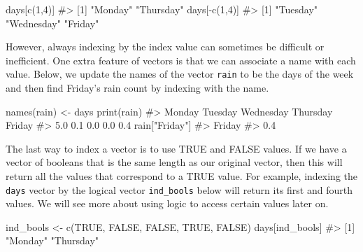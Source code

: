 \documentclass[
  letterpaper,
]{krantz}
\makeatletter
\newenvironment{Shaded}{\begin{snugshade}}{\end{snugshade}}
\newcommand{\CommentTok}[1]{\textcolor[rgb]{0.37,0.37,0.37}{#1}}
\newcommand{\ConstantTok}[1]{\textcolor[rgb]{0.56,0.35,0.01}{#1}}
\newcommand{\DecValTok}[1]{\textcolor[rgb]{0.68,0.00,0.00}{#1}}
\newcommand{\FunctionTok}[1]{\textcolor[rgb]{0.28,0.35,0.67}{#1}}
\newcommand{\NormalTok}[1]{\textcolor[rgb]{0.00,0.23,0.31}{#1}}
\newcommand{\OtherTok}[1]{\textcolor[rgb]{0.00,0.23,0.31}{#1}}
\newcommand{\SpecialCharTok}[1]{\textcolor[rgb]{0.37,0.37,0.37}{#1}}
\newcommand{\StringTok}[1]{\textcolor[rgb]{0.13,0.47,0.30}{#1}}
\newenvironment{kframe}{%
\medskip{}
\setlength{\fboxsep}{.8em}
 \def\at@end@of@kframe{}%
 \ifinner\ifhmode%
  \def\at@end@of@kframe{\end{minipage}}%
  \begin{minipage}{\columnwidth}%
 \fi\fi%
 \def\FrameCommand##1{\hskip\@totalleftmargin \hskip-\fboxsep
 \colorbox{shadecolor}{##1}\hskip-\fboxsep
     \hskip-\linewidth \hskip-\@totalleftmargin \hskip\columnwidth}%
 \MakeFramed {\advance\hsize-\width
   \@totalleftmargin\z@ \linewidth\hsize
   \@setminipage}}%
 {\par\unskip\endMakeFramed%
 \at@end@of@kframe}
\renewenvironment{Shaded}{\begin{kframe}}{\end{kframe}}
\makeatother
\begin{document}
\begin{Shaded}
\begin{Highlighting}[]
\NormalTok{days[}\FunctionTok{c}\NormalTok{(}\DecValTok{1}\NormalTok{,}\DecValTok{4}\NormalTok{)]}
\CommentTok{\#\textgreater{} [1] "Monday"   "Thursday"}
\NormalTok{days[}\SpecialCharTok{{-}}\FunctionTok{c}\NormalTok{(}\DecValTok{1}\NormalTok{,}\DecValTok{4}\NormalTok{)]}
\CommentTok{\#\textgreater{} [1] "Tuesday"   "Wednesday" "Friday"}
\end{Highlighting}
\end{Shaded}

However, always indexing by the index value can sometimes be difficult
or inefficient. One extra feature of vectors is that we can associate a
name with each value. Below, we update the names of the vector
\texttt{rain} to be the days of the week and then find Friday's rain
count by indexing with the name.

\begin{Shaded}
\begin{Highlighting}[]
\FunctionTok{names}\NormalTok{(rain) }\OtherTok{\textless{}{-}}\NormalTok{ days}
\FunctionTok{print}\NormalTok{(rain)}
\CommentTok{\#\textgreater{}    Monday   Tuesday Wednesday  Thursday    Friday }
\CommentTok{\#\textgreater{}       5.0       0.1       0.0       0.0       0.4}
\NormalTok{rain[}\StringTok{"Friday"}\NormalTok{]}
\CommentTok{\#\textgreater{} Friday }
\CommentTok{\#\textgreater{}    0.4}
\end{Highlighting}
\end{Shaded}

The last way to index a vector is to use TRUE and FALSE values. If we
have a vector of booleans that is the same length as our original
vector, then this will return all the values that correspond to a TRUE
value. For example, indexing the \texttt{days} vector by the logical
vector \texttt{ind\_bools} below will return its first and fourth
values. We will see more about using logic to access certain values
later on.

\begin{Shaded}
\begin{Highlighting}[]
\NormalTok{ind\_bools }\OtherTok{\textless{}{-}} \FunctionTok{c}\NormalTok{(}\ConstantTok{TRUE}\NormalTok{, }\ConstantTok{FALSE}\NormalTok{, }\ConstantTok{FALSE}\NormalTok{, }\ConstantTok{TRUE}\NormalTok{, }\ConstantTok{FALSE}\NormalTok{)}
\NormalTok{days[ind\_bools]}
\CommentTok{\#\textgreater{} [1] "Monday"   "Thursday"}
\end{Highlighting}
\end{Shaded}
\end{document}
